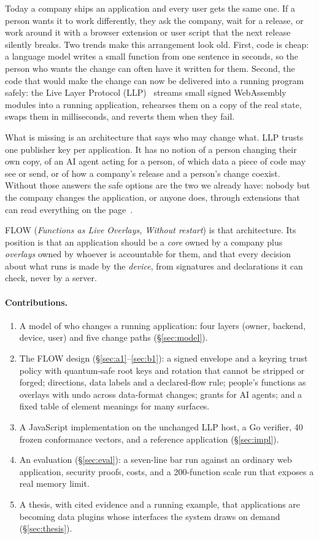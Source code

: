 \documentclass[10pt,twocolumn]{article}
\begin{document}
Today a company ships an application and every user gets the same one. If a person wants it to work
differently, they ask the company, wait for a release, or work around it with a browser extension
or user script that the next release silently breaks. Two trends make this arrangement look old.
First, code is cheap: a language model writes a small function from one sentence in seconds, so
the person who wants the change can often have it written for them. Second, the code that would
make the change can now be delivered into a running program safely: the Live Layer Protocol
(LLP)~\cite{llp2026} streams small signed WebAssembly~\cite{haas2017wasm} modules into a running
application, rehearses them on a copy of the real state, swaps them in milliseconds, and reverts
them when they fail.

What is missing is an architecture that says who may change what. LLP trusts one publisher key per
application. It has no notion of a person changing their own copy, of an AI agent acting for a
person, of which data a piece of code may see or send, or of how a company's release and a person's
change coexist. Without those answers the safe options are the two we already have: nobody but the
company changes the application, or anyone does, through extensions that can read everything on
the page~\cite{kapravelos2014hulk}.

FLOW (\emph{Functions as Live Overlays, Without restart}) is that architecture. Its position is
that an application should be a \emph{core} owned by a company plus \emph{overlays} owned by
whoever is accountable for them, and that every decision about what runs is made by the
\emph{device}, from signatures and declarations it can check, never by a server.

\paragraph{Contributions.}
\begin{enumerate}
\item A model of who changes a running application: four layers (owner, backend, device, user) and
five change paths (\S\ref{sec:model}).
\item The FLOW design (\S\ref{sec:a1}--\ref{sec:b1}): a signed envelope and a keyring trust policy
with quantum-safe root keys and rotation that cannot be stripped or forged; directions, data labels
and a declared-flow rule; people's functions as overlays with undo across data-format changes;
grants for AI agents; and a fixed table of element meanings for many surfaces.
\item A JavaScript implementation on the unchanged LLP host, a Go verifier, 40 frozen conformance
vectors, and a reference application (\S\ref{sec:impl}).
\item An evaluation (\S\ref{sec:eval}): a seven-line bar run against an ordinary web application,
security proofs, costs, and a 200-function scale run that exposes a real memory limit.
\item A thesis, with cited evidence and a running example, that applications are becoming data
plugins whose interfaces the system draws on demand (\S\ref{sec:thesis}).
\end{enumerate}
\end{document}
